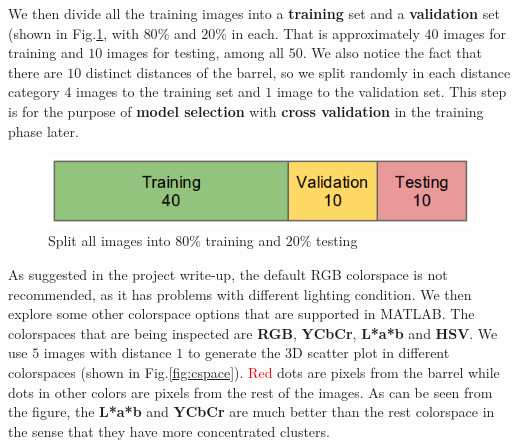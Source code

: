 \documentclass[twoside]{article}
\newcommand{\red}[1]{\textcolor{red}{#1}}
\begin{document}
\begin{multicols}{2}
We then divide all the training images into a \textbf{training} set and a \textbf{validation} set (shown in Fig.\ref{fig:data_split}, with $80\%$ and $20\%$ in each. That is approximately $40$ images for training and $10$ images for testing, among all $50$. We also notice the fact that there are $10$ distinct distances of the barrel, so we split randomly in each distance category $4$ images to the training set and $1$ image to the validation set. This step is for the purpose of \textbf{model selection} with \textbf{cross validation} in the training phase later.

\begin{figure}[H]
  \centering
  \includegraphics[width=\columnwidth]{data_split.png}
    \caption{Split all images into $80\%$ training and $20\%$ testing}
    \label{fig:data_split}
\end{figure}

As suggested in the project write-up, the default RGB colorspace is not recommended, as it has problems with different lighting condition. We then explore some other colorspace options that are supported in MATLAB. The colorspaces that are being inspected are \textbf{RGB}, \textbf{YCbCr}, \textbf{L*a*b} and \textbf{HSV}. We use $5$ images with distance $1$ to generate the 3D scatter plot in different colorspaces (shown in Fig.\ref{fig:cspace}). \red{Red} dots are pixels from the barrel while dots in other colors are pixels from the rest of the images. As can be seen from the figure, the \textbf{L*a*b} and \textbf{YCbCr} are much better than the rest colorspace in the sense that they have more concentrated clusters.


\end{multicols}
\end{document}
